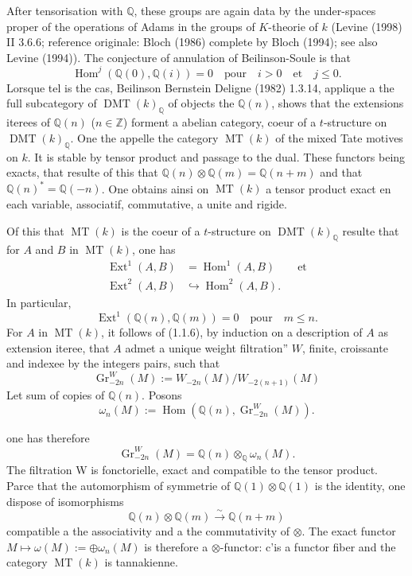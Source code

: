 \documentclass[11pt,a4paper]{article}
\theoremstyle{plain}
\theoremstyle{definition}
\theoremstyle{remark}
\DeclareMathOperator{\Ext}{Ext}
\DeclareMathOperator{\Hom}{Hom}
\DeclareMathOperator{\Gr}{Gr}
\DeclareMathOperator{\MT}{MT}
\DeclareMathOperator{\DMT}{DMT}
\newcommand{\dbQ}{\mathbb{Q}}
\newcommand{\dbZ}{\mathbb{Z}}
\newcommand{\Le}{\leqslant}
\newcommand{\simover}{\xrightarrow{\sim}}
\providecommand{\Hom}{\operatorname{Hom}}
\providecommand{\Ext}{\operatorname{Ext}}
\providecommand{\Le}{\leqslant}
\begin{document}
After tensorisation with $\dbQ$, these groups
are again data by the under-spaces
proper of the operations of Adams in the
groups of $K$-theorie of $k$ (Levine
(1998) II 3.6.6; reference originale:
Bloch (1986) complete by Bloch (1994);
see also Levine (1994)).
The conjecture of annulation of
Beilinson-Soule is that
\begin{equation}
\Hom^j(\dbQ(0),\dbQ(i))=0\quad
\text{pour}\quad i>0\quad\text{et}\quad
j\Le 0.
\tag{1.1.3}
\end{equation}
Lorsque tel is the cas, Beilinson Bernstein
Deligne (1982) 1.3.14, applique a the
full subcategory of $\DMT(k)_{\dbQ}$
of objects the $\dbQ(n)$, shows that the
extensions iterees of $\dbQ(n)$
($n\in\dbZ$) forment a abelian category, coeur of a $t$-structure on
$\DMT(k)_{\dbQ}$.
One the appelle the category
$\MT(k)$ of the mixed Tate motives on $k$.
It is stable by tensor product and
passage to the dual.
These functors being exacts, that resulte
of this that $\dbQ(n)\otimes\dbQ(m)=\dbQ(n+m)$ and
that $\dbQ(n)^*=\dbQ(-n)$.
One obtains ainsi on $\MT(k)$ a tensor product exact en each variable,
associatif, commutative, a unite and rigide.

Of this that $\MT(k)$ is the coeur of a
$t$-structure on $\DMT(k)_{\dbQ}$ resulte
that for $A$ and $B$ in $\MT(k)$, one has
\begin{align}
\Ext^1(A,B) &= \Hom^1(A,B)\qquad\text{et}\tag{1.1.4}\\
\Ext^2(A,B) &\hookrightarrow \Hom^2(A,B).\tag{1.1.5}
\end{align}
In particular,
\begin{equation}
\Ext^1(\dbQ(n),\dbQ(m))=0\quad
\text{pour}\quad m\Le n.\tag{1.1.6}
\end{equation}
For $A$ in $\MT(k)$, it follows of
(1.1.6), by induction on a description of
$A$ as extension iteree, that $A$ admet
a unique weight filtration''
$W$, finite, croissante and indexee by the
integers pairs, such that
\begin{equation}
\Gr_{-2n}^W(M):= W_{-2n}(M)/W_{-2(n+1)}(M)
\end{equation}
Let sum of copies of $\dbQ(n)$.
Posons
\begin{equation}
\omega_n(M):=\Hom(\dbQ(n),\Gr_{-2n}^W(M)).
\end{equation}

one has therefore
\begin{equation}
\Gr_{-2n}^W(M)=\dbQ(n)\otimes_\dbQ
\omega_n(M).\end{equation}
The filtration W is fonctorielle, exact and
compatible to the tensor product.
Parce that the automorphism of symmetrie of
$\dbQ(1)\otimes\dbQ(1)$ is the identity, one
dispose of isomorphisms
\[
\dbQ(n)\otimes\dbQ(m)\simover\dbQ(n+m)
\]
compatible a the associativity and a the
commutativity of $\otimes$.
The exact functor $M\mapsto
\omega(M):=\oplus\omega_n(M)$ is therefore
a $\otimes$-functor: c'is a functor fiber
and the category $\MT(k)$ is tannakienne.
\end{document}
